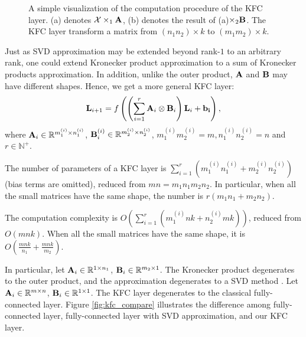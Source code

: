 \documentclass{article}
\def\A{{\bf A}}
\def\B{{\bf B}}
\def\L{{\bf L}}
\def\XM{{\mathcal X}}
\def\RB{{\mathbb R}}
\begin{document}
\begin{figure}
\centering
{}

\caption{A simple visualization of the computation procedure of the KFC layer. (a) denotes $\XM \times_1 \A$, (b) denotes the result of (a)$\times_2 \B$. The KFC layer transform a matrix from $(n_1n_2)\times k$ to $(m_1m_2)\times k$.}
\label{fig:fc}
\end{figure}

Just as SVD approximation may be extended beyond rank-$1$ to an arbitrary rank, one could extend Kronecker product approximation to a sum of Kronecker products approximation. In addition, unlike the outer product, $\A$ and $\B$ may have different shapes. Hence, we get a more general KFC layer:
\begin{align}
\label{full_kpsvd}
\L_{i+1} = f\left(\left(\sum_{i=1}^{r} \A_i \otimes \B_i\right)\L_i + \bf{b}_i\right),
\end{align}
where $\A_i \in \RB^{m_1^{(i)}\times n_1^{(i)}}$, $\B_i^{(i)} \in \RB^{m_2^{(i)}\times n_2^{(i)}}$, $m_1^{(i)}m_2^{(i)}=m, n_1^{(i)}n_2^{(i)}=n$ and
$r \in \mathbb{N^+}$.


The number of parameters of a KFC layer is $\sum_{i=1}^{r}(m_1^{(i)} n_1^{(i)} + m_2^{(i)} n_2^{(i)})$ (bias terms are omitted),
reduced from $mn = m_1 n_1 m_2 n_2$. In particular, when all the small matrices have the same shape, the number is $r(m_1n_1+m_2n_2)$.

The computation complexity is $O(\sum_{i=1}^{r}(m_1^{(i)} n k+n_2^{(i)} m k))$, reduced from $O(mnk)$.  When all the small matrices have the same shape, it is $O(\frac{mnk}{n_1}+\frac{mnk}{m_2})$.

In particular, let $\A_i \in \RB^{1\times n_1}$, $\B_i \in \RB^{m_2 \times 1}$. The Kronecker product degenerates to the outer product, and the
approximation degenerates to a SVD method \cite{xue2013restructuring,denton2014exploiting}. Let $\A_i \in \RB^{m \times n}$, $\B_i \in \RB^{1 \times
  1}$. The KFC layer degenerates to the classical fully-connected layer. Figure \ref{fig:kfc_compare} illustrates the difference among
fully-connected layer, fully-connected layer with SVD approximation, and our KFC layer.
\end{document}

